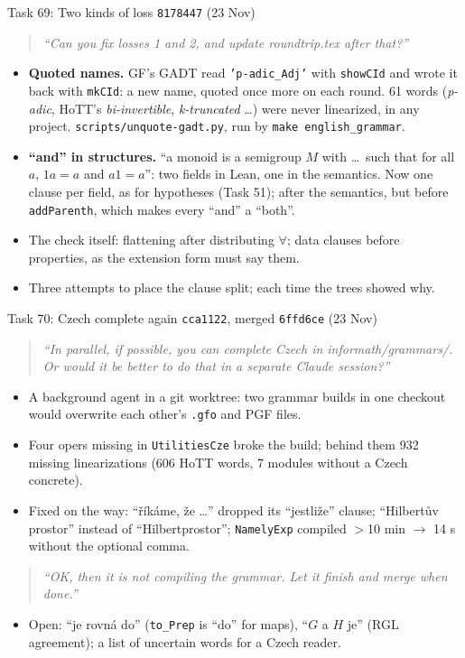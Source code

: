 \documentclass[10pt,aspectratio=169]{beamer}
\newcommand{\bad}[1]{\textcolor{warn}{#1}}
\newcommand{\ok}[1]{\textcolor{good}{#1}}
\newcommand{\commit}[1]{\texttt{\footnotesize #1}}
\newcommand{\prompt}[1]{\begin{quote}\small\itshape ``#1''\end{quote}}
\begin{document}
\begin{frame}{Task 69: Two kinds of loss}
  \commit{8178447} (23 Nov)
  \prompt{Can you fix losses 1 and 2, and update roundtrip.tex after that?}
  \begin{itemize}\small
    \item \textbf{Quoted names.} GF's GADT read \texttt{'p-adic\_Adj'} with \texttt{showCId} and
          wrote it back with \texttt{mkCId}: \bad{a new name, quoted once more on each round}.
          61 words (\emph{p-adic}, HoTT's \emph{bi-invertible}, \emph{k-truncated} \ldots) were
          \bad{never linearized}, in any project. \texttt{scripts/unquote-gadt.py}, run by
          \texttt{make english\_grammar}.
    \item \textbf{``and'' in structures.} ``a monoid is a semigroup $M$ with \ldots\ such that
          for all $a$, $1a = a$ and $a1 = a$'': two fields in Lean, one in the semantics. Now
          \ok{one clause per field}, as for hypotheses (Task 51); after the semantics, but
          \bad{before \texttt{addParenth}}, which makes every ``and'' a ``both''.
    \item The check itself: flattening after distributing $\forall$; data clauses before
          properties, as the extension form must say them.
    \item Three attempts to place the clause split; each time the trees showed why.
  \end{itemize}
\end{frame}

\begin{frame}{Task 70: Czech complete again}
  \commit{cca1122}, merged \commit{6ffd6ce} (23 Nov)
  \prompt{In parallel, if possible, you can complete Czech in informath/grammars/. Or would it
  be better to do that in a separate Claude session?}
  \begin{itemize}\small
    \item A background agent in a git worktree: two grammar builds in one checkout would
          overwrite each other's \texttt{.gfo} and PGF files.
    \item \bad{Four opers} missing in \texttt{UtilitiesCze} broke the build; behind them
          \bad{932 missing linearizations} (606 HoTT words, 7 modules without a Czech
          concrete).
    \item Fixed on the way: ``říkáme, že \ldots'' dropped its ``jestliže'' clause; ``Hilbertův
          prostor'' instead of ``Hilbertprostor''; \texttt{NamelyExp} compiled
          \bad{$>$10 min} $\to$ \ok{14 s} without the optional comma.
  \end{itemize}
  \prompt{OK, then it is not compiling the grammar. Let it finish and merge when done.}
  \begin{itemize}\small
    \item Open: ``je rovná do'' (\texttt{to\_Prep} is ``do'' for maps), ``$G$ a $H$ je'' (RGL
          agreement); a list of uncertain words for a Czech reader.
  \end{itemize}
\end{frame}
\end{document}
